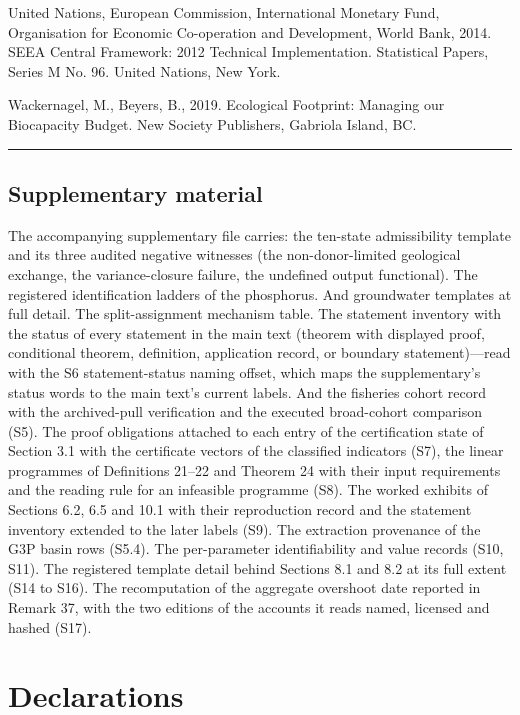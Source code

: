 \documentclass[11pt]{article}
\begin{document}
United Nations, European Commission, International Monetary Fund, Organisation for Economic Co-operation and Development, World Bank, 2014. SEEA Central Framework: 2012 Technical Implementation. Statistical Papers, Series M No. 96. United Nations, New York.

Wackernagel, M., Beyers, B., 2019. Ecological Footprint: Managing our
Biocapacity Budget. New Society Publishers, Gabriola Island, BC.

\begin{center}\rule{0.5\linewidth}{0.5pt}\end{center}

\subsection{Supplementary material}\label{supplementary-material}

The accompanying supplementary file carries: the ten-state admissibility template and its three audited negative witnesses (the non-donor-limited geological exchange, the variance-closure failure, the undefined output functional). The registered identification ladders of the phosphorus. And groundwater templates at full detail. The split-assignment mechanism table. The statement inventory with the status of every statement in the main text (theorem with displayed proof, conditional theorem, definition, application record, or boundary statement)---read with the S6 statement-status naming offset, which maps the supplementary's status words to the main text's current labels. And the fisheries cohort record with the archived-pull verification and the executed broad-cohort comparison (S5). The proof obligations attached to each entry of the certification state of Section 3.1 with the certificate vectors of the classified indicators (S7), the linear programmes of Definitions 21--22 and Theorem 24 with their input requirements and the reading rule for an infeasible programme (S8). The worked exhibits of Sections 6.2, 6.5 and 10.1 with their reproduction record and the statement inventory extended to the later labels (S9). The extraction provenance of the G3P basin rows (S5.4). The per-parameter identifiability and value records (S10, S11). The registered template detail behind Sections 8.1 and 8.2 at its full extent (S14 to S16). The recomputation of the aggregate overshoot date reported in Remark 37, with the two editions of the accounts it reads named, licensed and hashed (S17).

\section*{Declarations}
\end{document}
